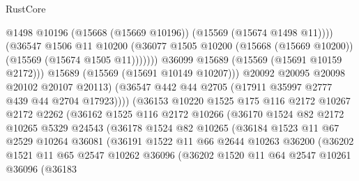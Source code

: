 \begin{lexlean}{RustCore}
\begin{coremodule}
                                  @1498
                                  @10196
                                  (@15668 (@15669 @10196))
                                  (@15569 (@15674 @1498 @11))))
                              (@36547
                                @1506
                                @11
                                @10200
                                (@36077
                                  @1505
                                  @10200
                                  (@15668 (@15669 @10200))
                                  (@15569 (@15674 @1505 @11)))))))
                        @36099
                        @15689
                        (@15569 (@15691 @10159 @2172)))
                      @15689
                      (@15569 (@15691 @10149 @10207)))
                    @20092
                    @20095
                    @20098
                    @20102
                    @20107
                    @20113)
                  (@36547 @442 @44 @2705 (@17911 @35997 @2777 @439 @44 @2704 @17923))))
              (@36153
                @10220
                @1525
                @175
                @116
                @2172
                @10267
                @2172
                @2262
                (@36162
                  @1525
                  @116
                  @2172
                  @10266
                  (@36170
                    @1524
                    @82
                    @2172
                    @10265
                    @5329
                    @24543
                    (@36178
                      @1524
                      @82
                      @10265
                      (@36184
                        @1523
                        @11
                        @67
                        @2529
                        @10264
                        @36081
                        (@36191
                          @1522
                          @11
                          @66
                          @2644
                          @10263
                          @36200
                          (@36202
                            @1521
                            @11
                            @65
                            @2547
                            @10262
                            @36096
                            (@36202
                              @1520
                              @11
                              @64
                              @2547
                              @10261
                              @36096
                              (@36183

\end{coremodule}
\end{lexlean}

